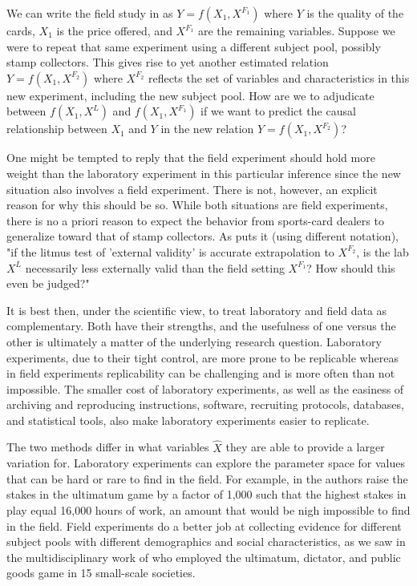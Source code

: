 \documentclass[12pt]{article}
\begin{document}
We can write the field study in \cite{List2006} as $Y=f\left(X_1,X^{F_1}\right)$ where $Y$ is the quality of the cards, $X_1$ is the price offered, and $X^{F_1}$ are the remaining variables. Suppose we were to repeat that same experiment using a different subject pool, possibly stamp collectors. This gives rise to yet another estimated relation $Y=f\left(X_1,X^{F_2}\right)$ where $X^{F_2}$ reflects the set of variables and characteristics in this new experiment, including the new subject pool. How are we to adjudicate between $f(X_1,X^L)$ and $f(X_1,X^{F_1})$ if we want to predict the causal relationship between $X_1$ and $Y$ in the new relation $Y=f\left(X_1,X^{F_2}\right)$?

One might be tempted to reply that the field experiment should hold more weight than the laboratory experiment in this particular inference since the new situation also involves a field experiment. There is not, however, an explicit reason for why this should be so. While both situations are field experiments, there is no a priori reason to expect the behavior from sports-card dealers to generalize toward that of stamp collectors. As \cite{camerer2011promise} puts it (using different notation), "if the litmus test of 'external validity' is accurate extrapolation to $X^{F_2}$, is the lab $X^L$ necessarily less externally valid than the field setting $X^{F_1}$? How should this even be judged?"

It is best then, under the scientific view, to treat laboratory and field data as complementary. Both have their strengths, and the usefulness of one versus the other is ultimately a matter of the underlying research question. Laboratory experiments, due to their tight control, are more prone to be replicable whereas in field experiments replicability can be challenging and is more often than not impossible. The smaller cost of laboratory experiments, as well as the easiness of archiving and reproducing instructions, software, recruiting protocols, databases, and statistical tools, also make laboratory experiments easier to replicate. 

The two methods differ in what variables $\hat{X}$ they are able to provide a larger variation for. Laboratory experiments can explore the parameter space for values that can be hard or rare to find in the field. For example, in \cite{andersen2011stakes} the authors raise the stakes in the ultimatum game by a factor of 1,000 such that the highest stakes in play equal 16,000 hours of work, an amount that would be nigh impossible to find in the field. Field experiments do a better job at collecting evidence for different subject pools with different demographics and social characteristics, as we saw in the multidisciplinary work of \cite{henrich2005economic} who employed the ultimatum, dictator, and public goods game in 15 small-scale societies. 
\end{document}
